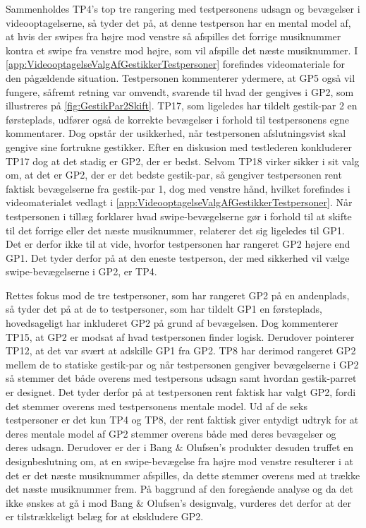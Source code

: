 \noindent
%
Sammenholdes TP4's top tre rangering med testpersonens udsagn og bevægelser i videooptagelserne, så tyder det på, at denne testperson har en mental model af, at hvis der swipes fra højre mod venstre så afspilles det forrige musiknummer kontra et swipe fra venstre mod højre, som vil afspille det næste musiknummer. I \autoref{app:VideooptagelseValgAfGestikkerTestpersoner} forefindes videomateriale for den pågældende situation. Testpersonen kommenterer ydermere, at GP5 også vil fungere, såfremt retning var omvendt, svarende til hvad der gengives i GP2, som illustreres på \autoref{fig:GestikPar2Skift}. TP17, som ligeledes har tildelt gestik-par 2 en førsteplads, udfører også de korrekte bevægelser i forhold til testpersonens egne kommentarer. Dog opstår der usikkerhed, når testpersonen afslutningsvist skal gengive sine fortrukne gestikker. Efter en diskusion med testlederen konkluderer TP17 dog at det stadig er GP2, der er bedst. Selvom TP18 virker sikker i sit valg om, at det er GP2, der er det bedste gestik-par, så gengiver testpersonen rent faktisk bevægelserne fra gestik-par 1, dog med venstre hånd, hvilket forefindes i videomaterialet vedlagt i \autoref{app:VideooptagelseValgAfGestikkerTestpersoner}. Når testpersonen i tillæg forklarer hvad swipe-bevægelserne gør i forhold til at skifte til det forrige eller det næste musiknummer, relaterer det sig ligeledes til GP1. Det er derfor ikke til at vide, hvorfor testpersonen har rangeret GP2 højere end GP1. Det tyder derfor på at den eneste testperson, der med sikkerhed vil vælge swipe-bevægelserne i GP2, er TP4. 

Rettes fokus mod de tre testpersoner, som har rangeret GP2 på en andenplads, så tyder det på at de to testpersoner, som har tildelt GP1 en førsteplads, hovedsageligt har inkluderet GP2 på grund af bevægelsen. Dog kommenterer TP15, at GP2 er modsat af hvad testpersonen finder logisk. Derudover pointerer TP12, at det var svært at adskille GP1 fra GP2. TP8 har derimod rangeret GP2 mellem de to statiske gestik-par og når testpersonen gengiver bevægelserne i GP2 så stemmer det både overens med testpersons udsagn samt hvordan gestik-parret er designet. Det tyder derfor på at testpersonen rent faktisk har valgt GP2, fordi det stemmer overens med testpersonens mentale model.\blankline 
%
Ud af de seks testpersoner er det kun TP4 og TP8, der rent faktisk giver entydigt udtryk for at deres mentale model af GP2 stemmer overens både med deres bevægelser og deres udsagn. Derudover er der i Bang $\&$ Olufsen's produkter desuden truffet en designbeslutning om, at en swipe-bevægelse fra højre mod venstre resulterer i at det er det næste musiknummer afspilles, da dette stemmer overens med at trække det næste musiknummer frem. På baggrund af den foregående analyse og da det ikke ønskes at gå i mod Bang $\&$ Olufsen's designvalg, vurderes det derfor at der er tilstrækkeligt belæg for at ekskludere GP2. 

